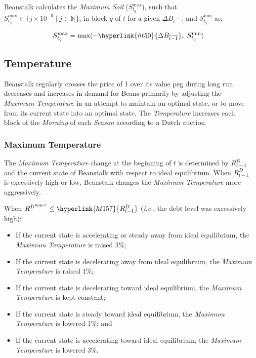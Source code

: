 \documentclass[tikz]{article}
\newcommand{\term}[1]{\textsl{#1}}
\newcommand{\Bean}{} %
\begin{document}
\vspace*{2mm}

Beanstalk calculates the \term{Maximum Soil} ($S_{t_q}^{\text{max}}$), such that $S_{t_q}^{\text{max}} \in \{j \times 10^{-6} \mid j \in \mathbb{N} \}$, in block $q$ of $t$ for a given \hyperlink{ht50}{$\Delta B_{\overline{t-1}}$} and $S_{t_q}^{\text{min}}$ as:

    $$
        S_{t_q}^{\text{max}} = 
            \text{max}(-\hyperlink{ht50}{\Delta B_{\overline{t-1}}},\ 
                    S_{t_q}^{\text{min}})
    $$


\subsection{Temperature}

Beanstalk regularly crosses the price of \Bean1 over its value peg during long run decreases and increases in demand for Beans primarily by adjusting the \term{Maximum Temperature} in an attempt to maintain an optimal state, or to move from its current state into an optimal state. The \term{Temperature} increases each block of the \term{Morning} of each \term{Season} according to a Dutch auction. 

\subsubsection{Maximum Temperature}

The \term{Maximum Temperature} change at the beginning of $t$ is determined by $R^D_{t-1}$ and the current state of Beanstalk with respect to ideal equilibrium. When $R^D_{t-1}$ is excessively high or low, Beanstalk changes the \term{Maximum Temperature} more aggressively.

When $R^{D^{\text{upper}}} \leq \hyperlink{ht157}{R^D_{t-1}}$ (\term{i.e.}, the debt level was excessively high):

\begin{itemize}[midsep]
    \item If the current state is accelerating or steady away from ideal equilibrium, the \term{Maximum Temperature} is raised 3\%;
    \item If the current state is decelerating away from ideal equilibrium, the \term{Maximum Temperature} is raised 1\%;
    \item If the current state is decelerating toward ideal equilibrium, the \term{Maximum Temperature} is kept constant;
    \item If the current state is steady toward ideal equilibrium, the \term{Maximum Temperature} is lowered 1\%; and
    \item If the current state is accelerating toward ideal equilibrium, the \term{Maximum Temperature} is lowered 3\%.
\end{itemize}
\end{document}
